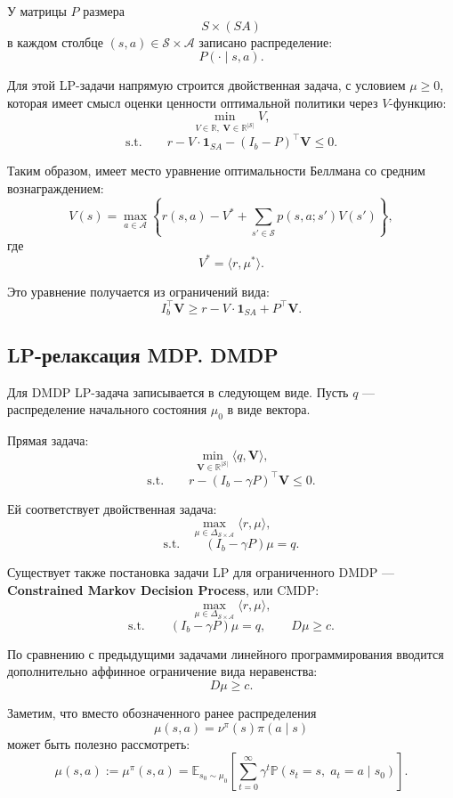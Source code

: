 \documentclass[12pt,a4paper]{article}
\begin{document}
У матрицы $P$ размера
\[
S \times (SA)
\]
в каждом столбце $(s,a) \in \mathcal S \times \mathcal A$ записано распределение:
\[
P(\cdot \mid s,a).
\]

Для этой LP-задачи напрямую строится двойственная задача, с условием $\mu \ge 0$, которая имеет смысл оценки ценности оптимальной политики через $V$-функцию:
\[
\min_{V \in \mathbb R,\; \mathbf V \in \mathbb R^{|\mathcal S|}}
V,
\]
\[
\text{s.t.}
\qquad
r
-
V \cdot \mathbf 1_{SA}
-
(I_b-P)^\top \mathbf V
\le 0.
\]

Таким образом, имеет место уравнение оптимальности Беллмана со средним вознаграждением:
\[
V(s)
=
\max_{a \in \mathcal A}
\left\{
r(s,a)
-
V^\ast
+
\sum_{s' \in \mathcal S}
p(s,a;s')V(s')
\right\},
\]
где
\[
V^\ast = \langle r,\mu^\ast \rangle.
\]

Это уравнение получается из ограничений вида:
\[
I_b^\top \mathbf V
\ge
r - V \cdot \mathbf 1_{SA} + P^\top \mathbf V.
\]

\subsection{LP-релаксация MDP. DMDP}

Для DMDP LP-задача записывается в следующем виде. Пусть $q$ --- распределение начального состояния $\mu_0$ в виде вектора.

Прямая задача:
\[
\min_{\mathbf V \in \mathbb R^{|\mathcal S|}}
\langle q,\mathbf V\rangle,
\]
\[
\text{s.t.}
\qquad
r - (I_b-\gamma P)^\top \mathbf V \le 0.
\]

Ей соответствует двойственная задача:
\[
\max_{\mu \in \Delta_{\mathcal S \times \mathcal A}}
\langle r,\mu\rangle,
\]
\[
\text{s.t.}
\qquad
(I_b-\gamma P)\mu = q.
\]

Существует также постановка задачи LP для ограниченного DMDP --- \textbf{Constrained Markov Decision Process}, или CMDP:
\[
\max_{\mu \in \Delta_{\mathcal S \times \mathcal A}}
\langle r,\mu\rangle,
\]
\[
\text{s.t.}
\qquad
(I_b-\gamma P)\mu = q,
\qquad
D\mu \ge c.
\]

По сравнению с предыдущими задачами линейного программирования вводится дополнительно аффинное ограничение вида неравенства:
\[
D\mu \ge c.
\]

Заметим, что вместо обозначенного ранее распределения
\[
\mu(s,a) = \nu^\pi(s)\pi(a \mid s)
\]
может быть полезно рассмотреть:
\[
\mu(s,a)
:=
\mu^\pi(s,a)
=
\mathbb E_{s_0 \sim \mu_0}
\left[
\sum_{t=0}^{\infty}
\gamma^t
\mathbb P(s_t=s,\; a_t=a \mid s_0)
\right].
\]
\end{document}
